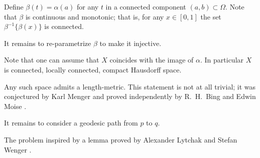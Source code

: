 Define $\beta(t)=\alpha(a)$ for any $t$ in a connected component $(a,b)\subset\Omega$.
Note that $\beta$ is continuous and monotonic;
that is, for any $x\in [0,1]$ the set $\beta^{-1}\{\beta(x)\}$ is connected.

It remains to re-parametrize $\beta$ to make it injective.
\qeds

Note that one can assume that $X$ coincides with the image of $\alpha$.
In particular $X$ is connected, locally connected, compact Hausdorff space.

Any such space admits a length-metric.
This statement is not at all trivial;
it was conjectured by Karl Menger \cite[see][]{menger}
and proved independently 
by R.~H.~Bing  \cite[see][]{bing-length-0, bing-length-1} 
and Edwin Moise \cite[see][]{moise}.

It remains to consider a geodesic path from $p$ to $q$.
\qeds

The problem inspired by a lemma 
proved by 
Alexander Lytchak
and Stefan Wenger \cite[see 7.13 in][]{lytchak-wenger}.


